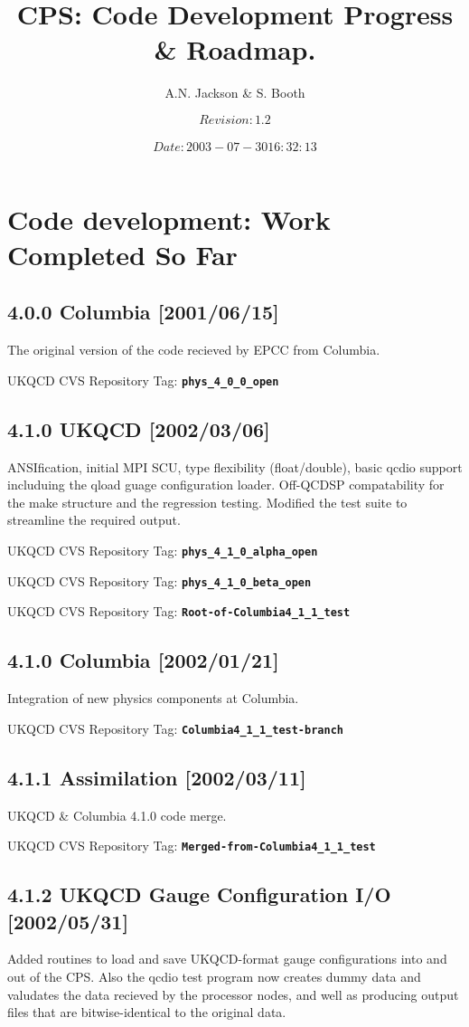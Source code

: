\documentclass[12pt]{article}
\title{CPS: Code Development Progress \& Roadmap.}
\author{A.N. Jackson \& S. Booth}
\date{\mbox{\small $$Revision: 1.2 $$  $$Date: 2003-07-30 16:32:13 $$}}
\newcommand{\ukqcdtag}[1]{{\small{UKQCD CVS Repository Tag: }{\bf{\tt{#1}}}}}
\begin{document}
\maketitle

\tableofcontents
\newpage

\section{Code development: Work Completed So Far}

\subsection{4.0.0 Columbia [2001/06/15]}
The original version of the code recieved by EPCC from Columbia.

\ukqcdtag{phys\_4\_0\_0\_open}

\subsection{4.1.0  UKQCD [2002/03/06]}
ANSIfication, initial MPI SCU, type flexibility (float/double), basic qcdio
support includuing the qload guage configuration loader.  Off-QCDSP
compatability for the make structure and the regression testing.  Modified the
test suite to streamline the required output.

\ukqcdtag{phys\_4\_1\_0\_alpha\_open}

\ukqcdtag{phys\_4\_1\_0\_beta\_open}

\ukqcdtag{Root-of-Columbia4\_1\_1\_test}

\subsection{4.1.0 Columbia [2002/01/21]}
Integration of new physics components at Columbia.

\ukqcdtag{Columbia4\_1\_1\_test-branch}

\subsection{4.1.1 Assimilation [2002/03/11]}
UKQCD \& Columbia 4.1.0 code merge.

\ukqcdtag{Merged-from-Columbia4\_1\_1\_test}

\subsection{4.1.2 UKQCD Gauge Configuration I/O [2002/05/31]}
Added routines to load and save UKQCD-format gauge configurations into and out
of the CPS.  Also the qcdio test program now creates dummy data and valudates
the data recieved by the processor nodes, and well as producing output files
that are bitwise-identical to the original data.
\end{document}
